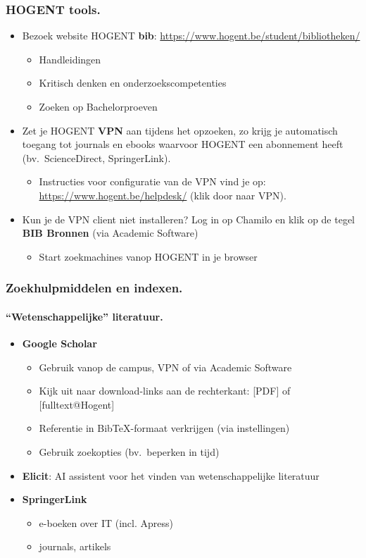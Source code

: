 \documentclass[aspectratio=169]{beamer}
\begin{document}
\begin{frame}
  \frametitle{HOGENT tools.}

  \begin{itemize}
    \item<+-> Bezoek website HOGENT \textbf{bib}: \url{https://www.hogent.be/student/bibliotheken/}
    \begin{itemize}
        \item Handleidingen
        \item Kritisch denken en onderzoekscompetenties
        \item Zoeken op Bachelorproeven
    \end{itemize}
    \item<+-> Zet je HOGENT \textbf{VPN} aan tijdens het opzoeken, zo krijg je automatisch toegang tot journals en ebooks waarvoor HOGENT een abonnement heeft (bv.~ScienceDirect, SpringerLink). 
    \begin{itemize}
        \item Instructies voor configuratie van de VPN vind je op: \url{https://www.hogent.be/helpdesk/} (klik door naar VPN).
    \end{itemize}
    \item<+-> Kun je de VPN client niet installeren? Log in op Chamilo en klik op de tegel \textbf{BIB Bronnen} (via Academic Software)
    \begin{itemize}
        \item Start zoekmachines vanop HOGENT in je browser
    \end{itemize}
    
  \end{itemize}
\end{frame}

\begin{frame}
  \frametitle{Zoekhulpmiddelen en indexen.}
  \framesubtitle{``Wetenschappelijke'' literatuur.}

  \begin{itemize}
    \item \textbf{Google Scholar}
      \begin{itemize}
        \item Gebruik vanop de campus, VPN of via Academic Software
        \item Kijk uit naar download-links aan de rechterkant: [PDF] of [fulltext@Hogent]
        \item Referentie in Bib{\TeX}-formaat verkrijgen (via instellingen)
        \item Gebruik zoekopties (bv.~beperken in tijd)
      \end{itemize}
    \item<+-> \textbf{Elicit}: AI assistent voor het vinden van wetenschappelijke literatuur
    \item<+-> \textbf{SpringerLink}
      \begin{itemize}
        \item e-boeken over IT (incl. Apress)
        \item journals, artikels
      \end{itemize}
  \end{itemize}
\end{frame}
\end{document}
